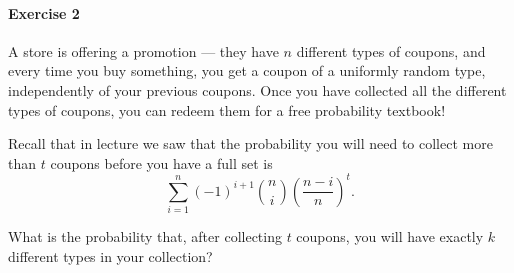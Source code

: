 \documentclass[a4paper,12pt]{article}
\begin{document}
\paragraph{Exercise 2}  A store is offering a promotion --- they have $n$ different types of coupons, and every time you buy something, you get a coupon of a uniformly random type, independently of your previous coupons. Once you have collected all the different types of coupons, you can redeem them for a free probability textbook!

Recall that in lecture we saw that the probability you will need to collect more than $t$ coupons before you have a full set is
\[ \sum_{i = 1}^n (-1)^{i+1} \binom{n}{i} \left( \frac{n-i}{n} \right)^t. \]

What is the probability that, after collecting $t$ coupons, you will have exactly $k$ different types in your collection?
\end{document}
